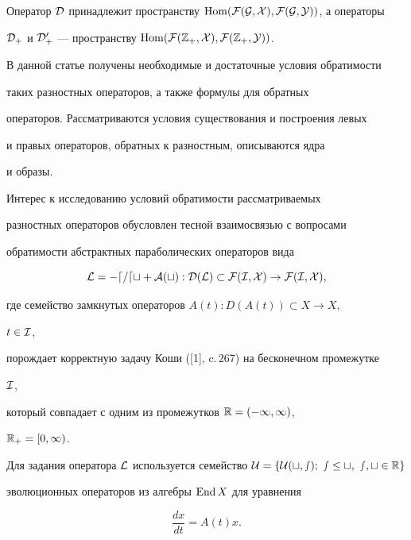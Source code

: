 Оператор $\cal D$ принадлежит пространству $\Hom(\cal F(G,X),\cal 


F(G,Y))$, а операторы 


$\cal D_+$ и $\cal D^0_+$ --- пространству $\Hom(\cal F(\Bbb 


Z_+,X),\cal F(\Bbb Z_+,Y))$. 


 


В данной статье получены необходимые и достаточные условия обратимости 


таких разностных операторов, а также формулы для обратных 


операторов. Рассматриваются условия существования и построения левых 


и правых операторов, обратных к разностным, описываются ядра 


и образы. 


 


Интерес к исследованию условий обратимости рассматриваемых 


разностных операторов обусловлен тесной взаимосвязью с вопросами 


обратимости абстрактных параболических операторов вида 


$$ 


\cal L=-d/d t+A(t):D(\cal L)\subset \cal F 


(\cal I,X)\to\cal F(\cal I,X), 


$$ 


где семейство замкнутых операторов $A(t):D(A(t))\subset X\to X$, 


$t\in\cal I$, 


порождает корректную задачу Коши ([1], c.\,267) на бесконечном промежутке 


$\cal I$, 


который совпадает с одним из промежутков $\Bbb R=(-\infty,\infty)$, 


$\Bbb R_+=[0,\infty)$. 


 


Для задания оператора $\cal L$ используется семейство $\cal U=\{\cal 


U(t,s);\ s\le t,\ s,t\in\Bbb R\}$ 


эволюционных операторов из алгебры $\operatorname{End} X$ для уравнения 


$$ 


\frac{d x}{d t}=A(t)x. 


$$ 


